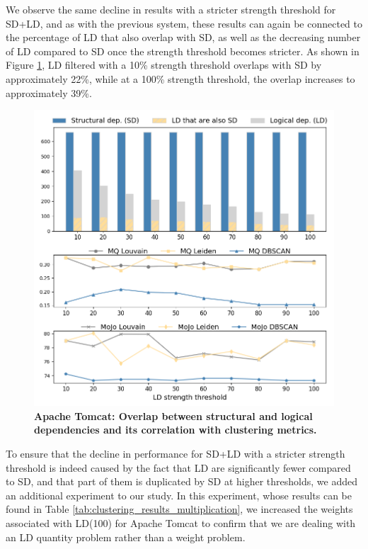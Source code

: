 \documentclass{ieeeaccess}
\begin{document}
We observe the same decline in results with a stricter strength threshold for SD+LD, and as with the previous system, these results can again be connected to the percentage of LD that also overlap with SD, as well as the decreasing number of LD compared to SD once the strength threshold becomes stricter. As shown in Figure \ref{fig:catalina_correlation}, LD filtered with a 10\% strength threshold overlaps with SD by approximately 22\%, while at a 100\% strength threshold, the overlap increases to approximately 39\%.



\begin{figure}[t!]
  \centering
  \includegraphics[width=\columnwidth]{catalina_correlation.png}
  \caption{\textbf{Apache Tomcat: Overlap between structural and logical dependencies and its correlation with clustering metrics.}}
  \label{fig:catalina_correlation}
\end{figure}


To ensure that the decline in performance for SD+LD with a stricter strength threshold is indeed caused by the fact that LD are significantly fewer compared to SD, and that part of them is duplicated by SD at higher thresholds, we added an additional experiment to our study. In this experiment, whose results can be found in Table \ref{tab:clustering_results_multiplication}, we increased the weights associated with LD(100) for Apache Tomcat to confirm that we are dealing with an LD quantity problem rather than a weight problem.
\end{document}
